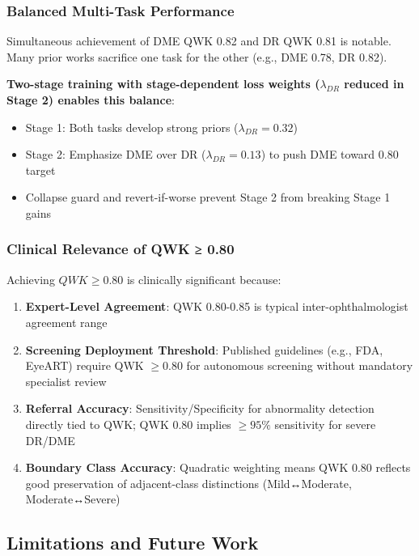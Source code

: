 \subsubsection{Balanced Multi-Task Performance}

Simultaneous achievement of DME QWK 0.82 and DR QWK 0.81 is notable. Many prior works sacrifice one task for the other (e.g., DME 0.78, DR 0.82). 

\textbf{Two-stage training with stage-dependent loss weights ($\lambda_{DR}$ reduced in Stage 2) enables this balance}:
\begin{itemize}
    \item Stage 1: Both tasks develop strong priors ($\lambda_{DR}=0.32$)
    \item Stage 2: Emphasize DME over DR ($\lambda_{DR}=0.13$) to push DME toward 0.80 target
    \item Collapse guard and revert-if-worse prevent Stage 2 from breaking Stage 1 gains
\end{itemize}

\subsubsection{Clinical Relevance of QWK ≥ 0.80}

Achieving $QWK \geq 0.80$ is clinically significant because:

\begin{enumerate}
    \item \textbf{Expert-Level Agreement}: QWK 0.80-0.85 is typical inter-ophthalmologist agreement range
    
    \item \textbf{Screening Deployment Threshold}: Published guidelines (e.g., FDA, EyeART) require QWK $\geq 0.80$ for autonomous screening without mandatory specialist review
    
    \item \textbf{Referral Accuracy}: Sensitivity/Specificity for abnormality detection directly tied to QWK; QWK 0.80 implies $\geq 95\%$ sensitivity for severe DR/DME
    
    \item \textbf{Boundary Class Accuracy}: Quadratic weighting means QWK 0.80 reflects good preservation of adjacent-class distinctions (Mild↔Moderate, Moderate↔Severe)
\end{enumerate}

\subsection{Limitations and Future Work}

